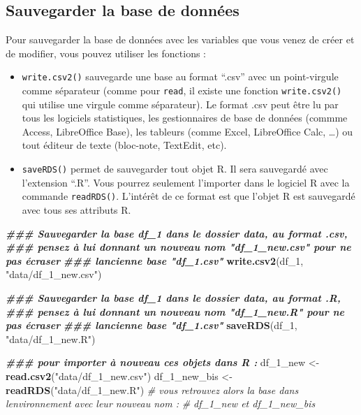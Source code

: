 \documentclass[
]{book}
\newenvironment{Shaded}{\begin{snugshade}}{\end{snugshade}}
\newcommand{\CommentTok}[1]{\textcolor[rgb]{0.56,0.35,0.01}{\textit{#1}}}
\newcommand{\DocumentationTok}[1]{\textcolor[rgb]{0.56,0.35,0.01}{\textbf{\textit{#1}}}}
\newcommand{\FunctionTok}[1]{\textcolor[rgb]{0.13,0.29,0.53}{\textbf{#1}}}
\newcommand{\NormalTok}[1]{#1}
\newcommand{\OtherTok}[1]{\textcolor[rgb]{0.56,0.35,0.01}{#1}}
\newcommand{\StringTok}[1]{\textcolor[rgb]{0.31,0.60,0.02}{#1}}
\providecommand{\tightlist}{%
  \setlength{\itemsep}{0pt}\setlength{\parskip}{0pt}}
\begin{document}
\subsection{Sauvegarder la base de données}\label{sauvegarder-la-base-de-donnuxe9es}

Pour sauvegarder la base de données avec les variables que vous venez de créer et de modifier, vous pouvez utiliser les fonctions :

\begin{itemize}
\tightlist
\item
  \texttt{write.csv2()} sauvegarde une base au format ``.csv'' avec un point-virgule comme séparateur (comme pour \texttt{read}, il existe une fonction \texttt{write.csv2()} qui utilise une virgule comme séparateur). Le format .csv peut être lu par tous les logiciels statistiques, les gestionnaires de base de données (commme Access, LibreOffice Base), les tableurs (comme Excel, LibreOffice Calc, \ldots) ou tout éditeur de texte (bloc-note, TextEdit, etc).
\item
  \texttt{saveRDS()} permet de sauvegarder tout objet R. Il sera sauvegardé avec l'extension ``.R''. Vous pourrez seulement l'importer dans le logiciel R avec la commande \texttt{readRDS()}. L'intérêt de ce format est que l'objet R est sauvegardé avec tous ses attributs R.
\end{itemize}

\begin{Shaded}
\begin{Highlighting}[]
\DocumentationTok{\#\#\# Sauvegarder la base df\_1 dans le dossier data, au format .csv,}
\DocumentationTok{\#\#\# pensez à lui donnant un nouveau nom "df\_1\_new.csv" pour ne pas écraser }
\DocumentationTok{\#\#\# l\textquotesingle{}ancienne base "df\_1.csv"}
\FunctionTok{write.csv2}\NormalTok{(df\_1, }\StringTok{"data/df\_1\_new.csv"}\NormalTok{)}

\DocumentationTok{\#\#\# Sauvegarder la base df\_1 dans le dossier data, au format .R,}
\DocumentationTok{\#\#\# pensez à lui donnant un nouveau nom "df\_1\_new.R" pour ne pas écraser }
\DocumentationTok{\#\#\# l\textquotesingle{}ancienne base "df\_1.csv"}
\FunctionTok{saveRDS}\NormalTok{(df\_1, }\StringTok{"data/df\_1\_new.R"}\NormalTok{)}

\DocumentationTok{\#\#\# pour importer à nouveau ces objets dans R : }
\NormalTok{df\_1\_new }\OtherTok{\textless{}{-}} \FunctionTok{read.csv2}\NormalTok{(}\StringTok{"data/df\_1\_new.csv"}\NormalTok{)}
\NormalTok{df\_1\_new\_bis }\OtherTok{\textless{}{-}} \FunctionTok{readRDS}\NormalTok{(}\StringTok{"data/df\_1\_new.R"}\NormalTok{)}
\CommentTok{\# vous retrouvez alors la base dans l\textquotesingle{}environnement avec leur nouveau nom : }
\CommentTok{\# df\_1\_new et df\_1\_new\_bis}
\end{Highlighting}
\end{Shaded}
\end{document}
